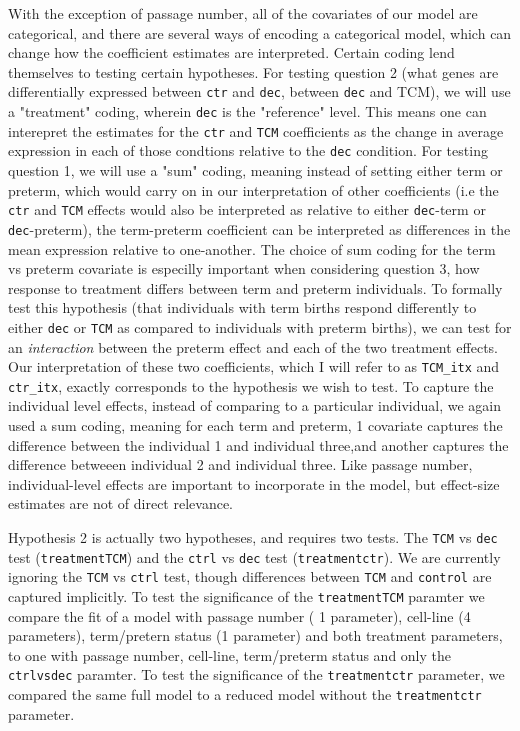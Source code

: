 \begin{itemize}
With the exception of passage number, all of the covariates of our model are categorical, and there are several ways of encoding a categorical model, which can change how the coefficient estimates are interpreted.
Certain coding lend themselves to testing certain hypotheses.  For testing question 2 (what genes are differentially expressed between \texttt{ctr} and \texttt{dec}, between \texttt{dec} and TCM), we will use a "treatment" coding,
wherein \texttt{dec} is the "reference" level.  This means one can interepret the estimates for the \texttt{ctr} and \texttt{TCM} coefficients as the change in average expression in each of those condtions relative to the \texttt{dec} condition.
For testing question 1, we will use a "sum" coding, meaning instead of setting either term or preterm, which would carry on in our interpretation of other coefficients (i.e the \texttt{ctr} and \texttt{TCM} effects would also be 
interpreted as relative to either \texttt{dec}-term or \texttt{dec}-preterm), the term-preterm coefficient can be interpreted as differences in the mean expression relative to one-another.  The choice of sum coding for the term vs preterm covariate 
is especilly important when considering question 3, how response to treatment differs between term and preterm individuals.  To formally test this hypothesis (that individuals with term births respond differently to either \texttt{dec} or \texttt{TCM} as compared to 
individuals with preterm births), we can test for an \emph{interaction} between the preterm effect and each of the two treatment effects.  Our interpretation of these two coefficients, which I will refer to as \texttt{TCM\_itx} and \texttt{ctr\_itx},
exactly corresponds to the hypothesis we wish to test.  To capture the individual level effects, instead of comparing to a particular individual, we again used a sum coding, meaning for each term and preterm, 
1 covariate captures the difference between the individual 1 and individual three,and another captures the difference betweeen individual 2 and individual three.  Like passage number, individual-level effects are important to
incorporate in the model, but effect-size estimates are not of direct relevance.

Hypothesis 2 is actually two hypotheses, and requires two tests. The \texttt{TCM} vs \texttt{dec} test (\texttt{treatmentTCM}) and the \texttt{ctrl} vs \texttt{dec} test (\texttt{treatmentctr}).
We are currently ignoring the \texttt{TCM} vs \texttt{ctrl} test, though differences between \texttt{TCM} and \texttt{control} are captured implicitly.  To test the significance of the \texttt{treatmentTCM} paramter we compare the fit of
a model with passage number ( 1 parameter), cell-line (4 parameters), term/pretern status (1 parameter) and both treatment parameters, to one with passage number, cell-line, term/preterm status and only the \texttt{ctrlvsdec} paramter.
To test the significance of the \texttt{treatmentctr} parameter, we compared the same full model to a reduced model without the \texttt{treatmentctr} parameter.



\end{itemize}
